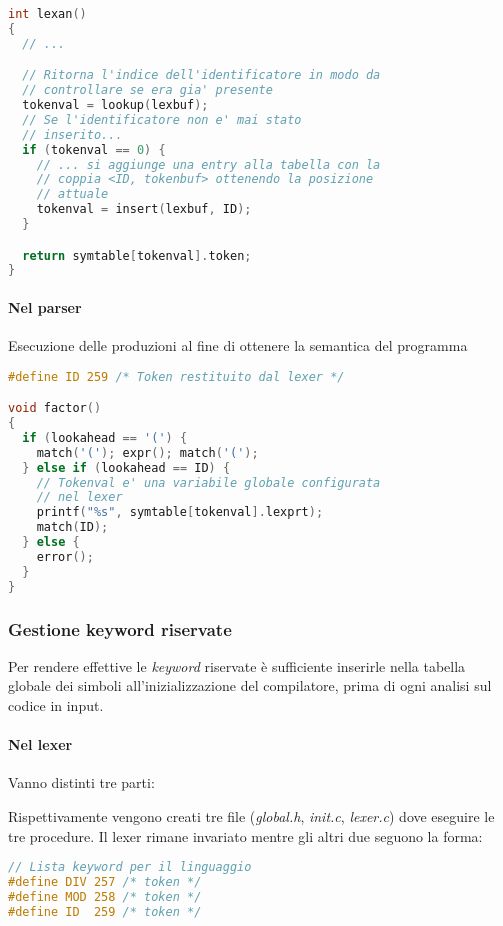 \begin{lstlisting}[language=C]
int lexan()
{
  // ...

  // Ritorna l'indice dell'identificatore in modo da
  // controllare se era gia' presente
  tokenval = lookup(lexbuf);
  // Se l'identificatore non e' mai stato
  // inserito...
  if (tokenval == 0) {
    // ... si aggiunge una entry alla tabella con la
    // coppia <ID, tokenbuf> ottenendo la posizione
    // attuale
    tokenval = insert(lexbuf, ID);
  }

  return symtable[tokenval].token;
}
\end{lstlisting}

\paragraph{Nel parser}
Esecuzione delle produzioni al fine di ottenere la semantica del programma
\begin{lstlisting}[language=C]
#define ID 259 /* Token restituito dal lexer */

void factor()
{
  if (lookahead == '(') {
    match('('); expr(); match('(');
  } else if (lookahead == ID) {
    // Tokenval e' una variabile globale configurata
    // nel lexer
    printf("%s", symtable[tokenval].lexprt);
    match(ID);
  } else {
    error();
  }
}
\end{lstlisting}

\subsubsection{Gestione keyword riservate}
Per rendere effettive le \textit{keyword} riservate è sufficiente inserirle
nella tabella globale dei simboli all'inizializzazione del compilatore, prima
di ogni analisi sul codice in input.

\paragraph{Nel lexer}
Vanno distinti tre parti:

Rispettivamente vengono creati tre file (\textit{global.h}, \textit{init.c},
\textit{lexer.c}) dove eseguire le tre procedure. Il lexer rimane invariato
mentre gli altri due seguono la forma:
\begin{lstlisting}[language=C,caption=global.h]
// Lista keyword per il linguaggio
#define DIV 257 /* token */
#define MOD 258 /* token */
#define ID  259 /* token */
\end{lstlisting}

